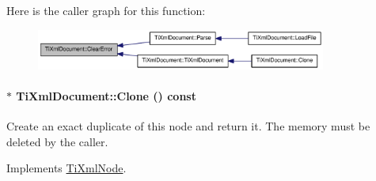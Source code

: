 Here is the caller graph for this function:\nopagebreak
\begin{figure}[H]
\begin{center}
\leavevmode
\includegraphics[width=270pt]{class_ti_xml_document_ac66b8c28db86363315712a3574e87c35_icgraph}
\end{center}
\end{figure}
\hypertarget{class_ti_xml_document_ac9e8f09b23454d953b32d1b65cd1409e}{
\paragraph[{Clone}]{ $\ast$ TiXmlDocument::Clone () const}\hfill}
\label{class_ti_xml_document_ac9e8f09b23454d953b32d1b65cd1409e}
Create an exact duplicate of this node and return it. The memory must be deleted by the caller. 

Implements \hyperlink{class_ti_xml_node_a4508cc3a2d7a98e96a54cc09c37a78a4}{TiXmlNode}.

